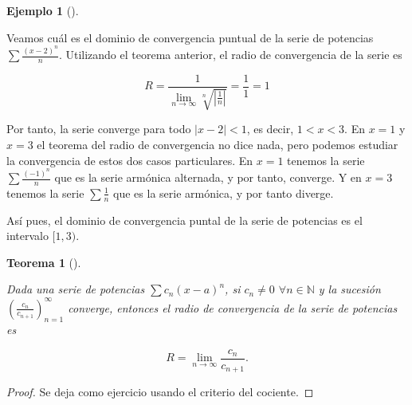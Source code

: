 \documentclass[
  a4paper,
]{scrreport}
\theoremstyle{plain}
\theoremstyle{plain}
\theoremstyle{definition}
\theoremstyle{definition}
\newtheorem{example}{Ejemplo}[chapter]
\theoremstyle{plain}
\newtheorem{theorem}{Teorema}[chapter]
\theoremstyle{remark}
\begin{document}
\leavevmode{}%
\begin{example}[]\label{exm-radio-convergencia-raiz}

Veamos cuál es el dominio de convergencia puntual de la serie de
potencias \(\sum \frac{(x-2)^n}{n}\). Utilizando el teorema anterior, el
radio de convergencia de la serie es

\[
R= \frac{1}{\lim_{n\to\infty} \sqrt[n]{|\frac{1}{n}|}} = \frac{1}{1} = 1
\]

Por tanto, la serie converge para todo \(|x-2|<1\), es decir, \(1<x<3\).
En \(x=1\) y \(x=3\) el teorema del radio de convergencia no dice nada,
pero podemos estudiar la convergencia de estos dos casos particulares.
En \(x=1\) tenemos la serie \(\sum \frac{(-1)^n}{n}\) que es la serie
armónica alternada, y por tanto, converge. Y en \(x=3\) tenemos la serie
\(\sum \frac{1}{n}\) que es la serie armónica, y por tanto diverge.

Así pues, el dominio de convergencia puntal de la serie de potencias es
el intervalo \([1,3)\).

\end{example}

\leavevmode{}%
\begin{theorem}[]\label{thm-radio-convergencia-cociente}

Dada una serie de potencias \(\sum c_n(x-a)^n\), si \(c_n\neq 0\)
\(\forall n\in\mathbb{N}\) y la sucesión
\(\left(\frac{c_n}{c_{n+1}}\right)_{n=1}^\infty\) converge, entonces el
radio de convergencia de la serie de potencias es

\[
R = \lim_{n\to\infty} \frac{c_n}{c_{n+1}}.
\]

\end{theorem}

\begin{tcolorbox}[enhanced jigsaw, breakable, bottomrule=.15mm, coltitle=black, bottomtitle=1mm, opacityback=0, title=\textcolor{quarto-callout-note-color}{\faInfo}\hspace{0.5em}{Demostración}, left=2mm, toptitle=1mm, toprule=.15mm, opacitybacktitle=0.6, colframe=quarto-callout-note-color-frame, arc=.35mm, colback=white, rightrule=.15mm, titlerule=0mm, leftrule=.75mm, colbacktitle=quarto-callout-note-color!10!white]

\begin{proof}

Se deja como ejercicio usando el criterio del cociente.

\end{proof}

\end{tcolorbox}
\end{document}
